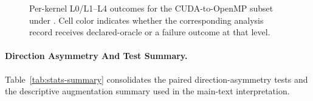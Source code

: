 \begin{figure}[t]
  \centering
  
  \caption{Per-kernel L0/L1--L4 outcomes for the CUDA-to-OpenMP subset under
  \qwenshort{}. Cell color indicates whether the corresponding analysis record
  receives declared-oracle \pass{} or a failure outcome at that level.}
  \label{fig:aug-heatmap}
\end{figure}

\paragraph{Direction Asymmetry And Test Summary.}
Table~\ref{tab:stats-summary} consolidates the paired direction-asymmetry tests
and the descriptive augmentation summary used in the main-text interpretation.

